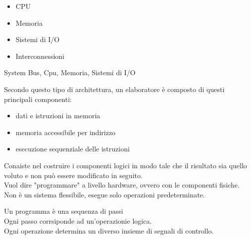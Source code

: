 \documentclass[12pt, a4paper]{article}
\begin{document}
\begin{itemize}
	\item CPU
	\item Memoria
	\item Sistemi di I/O
	\item Interconnessioni
\end{itemize}

\begin{center}
\begin{smartdiagram}
	{System Bus, Cpu, Memoria, Sistemi di I/O}
\end{smartdiagram}
\end{center}

\begin{defn} 
Secondo questo tipo di architettura, un elaboratore è composto di questi
principali componenti:
\begin{itemize}
	\item dati e istruzioni in memoria
	\item memoria accessibile per indirizzo
	\item esecuzione sequenziale delle istruzioni
\end{itemize}
\end{defn}

\begin{defn}
	Conaiste nel costruire i componenti logici in modo tale che il risultato 
	sia quello voluto e non può essere modificato in seguito.\\
	Vuol dire "programmare" a livello hardware, ovvero con le 
	componenti fisiche.\\
	Non è un sistema flessibile, esegue solo operazioni predeterminate.
\end{defn}

\begin{defn}[Programma]
	Un programma è una sequenza di passi\\
	Ogni passo corrsiponde ad un'operazionie logica.\\
	Ogni operazione determina un diverso insieme di segnali di controllo.\\
\end{defn}
\end{document}
